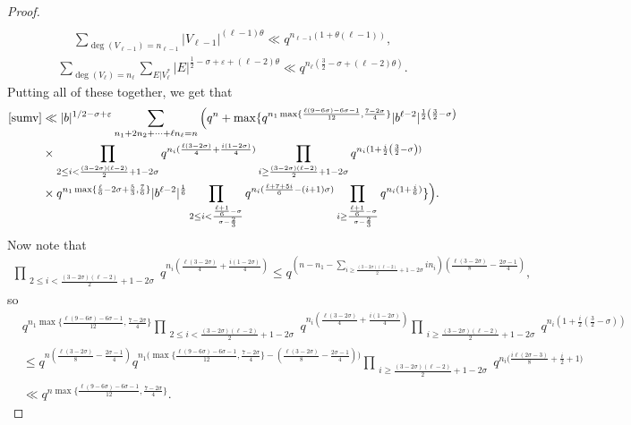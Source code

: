 \documentclass[10pt,a4paper]{amsart}
\begin{document}
\begin{proof}
\begin{align*}
\end{align*}
\begin{align*}
\sum_{\deg(V_{\ell-1})=n_{\ell-1}} |V_{\ell-1}|^{(\ell-1)\theta}\ll q^{n_{\ell-1}(1+\theta (\ell-1))},
\end{align*}
\begin{align*}
\sum_{\deg(V_{\ell}) = n_{\ell}} \sum_{E | V_{\ell}^{*}} |E|^{\frac{1}{2}-\sigma+\varepsilon+(\ell-2)\theta} \ll q^{n_{\ell}(\frac{3}{2}-\sigma+(\ell-2)\theta)}.
\end{align*}
Putting all of these together, we get that
\begin{align}
\eqref{sumv} & \ll |b|^{1/2-\sigma+\varepsilon} \sum_{n_1+2n_2+\cdots+\ell n_{\ell}=n} \Big( q^n +\max\{ q^{n_1 \max\{ \frac{\ell(9-6\sigma)-6\sigma-1}{12} , \frac{7-2\sigma}{4} \}} |b^{\ell-2}|^{\frac{1}{2}\left(\frac{3}{2}-\sigma\right)}  \nonumber \\
& \times  \prod_{\substack{2 \leq i < { \frac{(3-2\sigma)(\ell-2)}{2}+1-2\sigma }}} q^{n_i (\frac{\ell(3-2\sigma)}{4}+\frac{i(1-2\sigma)}{4} )}  \prod_{\substack{i \geq
{ \frac{(3-2\sigma)(\ell-2)}{2}+1-2\sigma }}} q^{n_i (1+\frac{i}{2}\left(\frac{3}{2}-\sigma\right))}  \nonumber \\
&\times q^{n_1 \max\{ \frac{\ell}{6}-2\sigma+\frac{5}{3}, \frac{7}{6} \}} |b^{\ell-2}|^{\frac{1}{6}} \prod_{2 \leq i< \frac{ \frac{\ell+1}{6} -\sigma}{\sigma-\frac{2}{3}}} q^{n_i ( \frac{\ell+7+5i}{6}-(i+1)\sigma)} \prod_{i \geq  \frac{ \frac{\ell+1}{6} -\sigma}{\sigma-\frac{2}{3}}} q^{n_i (1+\frac{i}{6})} \} \Big).\label{mixedbound}
\end{align}
Now note that 
\begin{align*}
 \prod_{\substack{2 \leq i < { \frac{(3-2\sigma)(\ell-2)}{2}+1-2\sigma }}} q^{n_i (\frac{\ell(3-2\sigma)}{4}+\frac{i(1-2\sigma)}{4} )} \leq q^{\left(n-n_1-\sum_{i \geq  \frac{(3-2\sigma)(\ell-2)}{2}+1-2\sigma } in_i\right) \left(  \frac{ \ell(3-2\sigma)}{8} - \frac{2\sigma-1}{4}\right)},
\end{align*}
so \begin{align*}
&  q^{n_1 \max\{ \frac{\ell(9-6\sigma)-6\sigma-1}{12} , \frac{7-2\sigma}{4} \}}   \prod_{\substack{2 \leq i < { \frac{(3-2\sigma)(\ell-2)}{2}+1-2\sigma }}} q^{n_i (\frac{\ell(3-2\sigma)}{4}+\frac{i(1-2\sigma)}{4} )}  \prod_{\substack{i \geq
{ \frac{(3-2\sigma)(\ell-2)}{2}+1-2\sigma }}} q^{n_i (1+\frac{i}{2}\left(\frac{3}{2}-\sigma\right))} \\
& \leq q^{n  (  \frac{ \ell(3-2\sigma)}{8} - \frac{2\sigma-1}{4})} q^{n_1 \Big(  \max\{ \frac{\ell(9-6\sigma)-6\sigma-1}{12} , \frac{7-2\sigma}{4} \} - ( \frac{\ell(3-2\sigma)}{8}-\frac{2\sigma-1}{4})\Big)} \prod_{\substack{i \geq
{ \frac{(3-2\sigma)(\ell-2)}{2}+1-2\sigma }}} q^{n_i \Big(\frac{i\ell(2\sigma-3)}{8}+\frac{i}{2}+1\Big)} \\
& \ll 
q^{ n \max\{ \frac{\ell(9-6\sigma)-6\sigma-1}{12} , \frac{7-2\sigma}{4} \}}.
\end{align*}


\end{proof}
\end{document}
